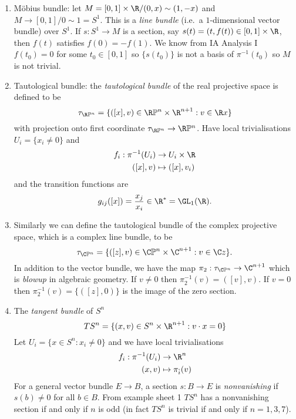 \documentclass[a4paper]{article}
\renewcommand*{\P}{\mathbb{P}}
\begin{document}
\begin{eg}\leavevmode
  \begin{enumerate}
  \item Möbius bundle: let \(M = [0, 1] \times \R /(0, x) \sim (1, -x)\) and \(M \to [0, 1]/0 \sim 1 = S^1\). This is a \emph{line bundle} (i.e.\ a \(1\)-dimensional vector bundle) over \(S^1\). If \(s: S^1 \to M\) is a section, say \(s(t) = (t, f(t)) \in [0, 1] \times \R\), then \(f(t)\) satisfies \(f(0) = -f(1)\). We know from IA Analysis I \(f(t_0) = 0\) for some \(t_0 \in [0, 1]\) so \(\{s(t_0)\}\) is not a basis of \(\pi^{-1}(t_0)\) so \(M\) is not trivial.
  \item Tautological bundle: the \emph{tautological bundle} of the real projective space is defined to be
    \[
      \tau_{\R\P^n} = \{([x], v) \in \R\P^n \times \R^{n + 1}: v \in \R x\}
    \]
    with projection onto first coordinate \(\tau_{\R\P^n} \to \R\P^n\). Have local trivialisations \(U_i = \{x_i \neq 0\}\) and
    \begin{align*}
      f_i: \pi^{-1}(U_i) &\to U_i \times \R \\
      ([x], v) &\mapsto ([x], v_i)
    \end{align*}
    and the transition functions are
    \[
      g_{ij}([x]) = \frac{x_j}{x_i} \in \R^* = \GL_1(\R).
    \]
  \item Similarly we can define the tautological bundle of the complex projective space, which is a complex line bundle, to be
    \[
      \tau_{\C\P^n} = \{([z], v) \in \C\P^n \times \C^{n + 1}: v \in \C z\}.
    \]
    In addition to the vector bundle, we have the map \(\pi_2: \tau_{\C\P^n} \to \C^{n + 1}\) which is \emph{blowup} in algebraic geometry. If \(v \neq 0\) then \(\pi_2^{-1}(v) = ([v], v)\). If \(v = 0\) then \(\pi_2^{-1}(v) = \{([z], 0)\}\) is the image of the zero section.
  \item The \emph{tangent bundle} of \(S^n\)
    \[
      TS^n = \{(x, v) \in S^n \times \R^{n + 1}: v \cdot x = 0\}
    \]
    Let \(U_i = \{x \in S^n: x_i \neq 0\}\) and we have local trivialisations
    \begin{align*}
      f_i: \pi^{-1}(U_i) &\to \R^n \\
      (x, v) &\mapsto \pi_{\hat i}(v)
    \end{align*}
    For a general vector bundle \(E \to B\), a section \(s: B \to E\) is \emph{nonvanishing} if \(s(b) \neq 0\) for all \(b \in B\). From example sheet 1 \(TS^n\) has a nonvanishing section if and only if \(n\) is odd (in fact \(TS^n\) is trivial if and only if \(n = 1, 3, 7\)).

\end{enumerate}
\end{eg}
\end{document}
